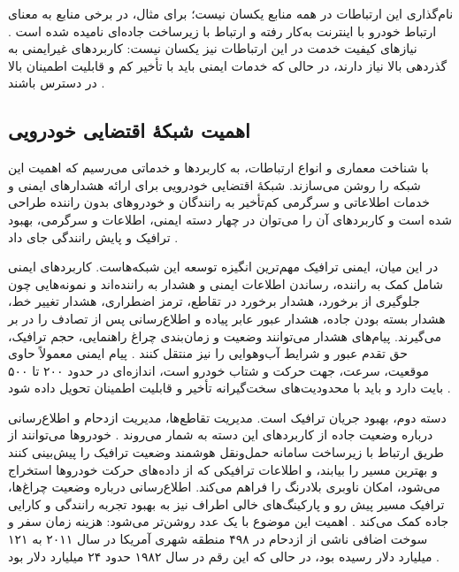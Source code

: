 \documentclass[12pt,a4paper]{article}
\begin{document}
نام‌گذاری این ارتباطات در همه منابع یکسان نیست؛ برای مثال، در برخی منابع  به معنای ارتباط خودرو با اینترنت به‌کار رفته و ارتباط با زیرساخت جاده‌ای  نامیده شده است \cite{luConnectedVehiclesSolutions2014}. نیاز‌های کیفیت خدمت  در این ارتباطات نیز یکسان نیست: کاربرد‌های غیرایمنی به گذردهی بالا نیاز دارند، در حالی که خدمات ایمنی باید با تأخیر کم و قابلیت اطمینان بالا در دسترس باشند \cite{hozouriOverviewVANETVehicular2023}.

\subsection{اهمیت شبکهٔ اقتضایی خودرویی}

با شناخت معماری و انواع ارتباطات، به کاربرد‌ها و خدماتی می‌رسیم که اهمیت این شبکه را روشن می‌سازند. شبکهٔ اقتضایی خودرویی برای ارائه هشدار‌های ایمنی و خدمات اطلاعاتی و سرگرمی کم‌تأخیر به رانندگان و خودرو‌های بدون راننده طراحی شده است و کاربرد‌های آن را می‌توان در چهار دسته ایمنی، اطلاعات و سرگرمی، بهبود ترافیک و پایش رانندگی جای داد \cite{hozouriOverviewVANETVehicular2023}.

در این میان، ایمنی ترافیک مهم‌ترین انگیزه توسعه این شبکه‌هاست. کاربرد‌های ایمنی شامل کمک به راننده، رساندن اطلاعات ایمنی و هشدار به راننده‌اند و نمونه‌هایی چون جلوگیری از برخورد، هشدار برخورد در تقاطع، ترمز اضطراری، هشدار تغییر خط، هشدار بسته بودن جاده، هشدار عبور عابر پیاده و اطلاع‌رسانی پس از تصادف را در بر می‌گیرند. پیام‌های هشدار می‌توانند وضعیت و زمان‌بندی چراغ راهنمایی، حجم ترافیک، حق تقدم عبور و شرایط آب‌وهوایی را نیز منتقل کنند \cite{hozouriOverviewVANETVehicular2023}. پیام ایمنی معمولاً حاوی موقعیت، سرعت، جهت حرکت و شتاب خودرو است، اندازه‌ای در حدود ۲۰۰ تا ۵۰۰ بایت دارد و باید با محدودیت‌های سخت‌گیرانه تأخیر و قابلیت اطمینان تحویل داده شود \cite{xuInternetVehiclesBig2018}.

دسته دوم، بهبود جریان ترافیک است. مدیریت تقاطع‌ها، مدیریت ازدحام و اطلاع‌رسانی درباره وضعیت جاده از کاربرد‌های این دسته به شمار می‌روند \cite{hozouriOverviewVANETVehicular2023}. خودرو‌ها می‌توانند از طریق ارتباط با زیرساخت سامانه حمل‌ونقل هوشمند وضعیت ترافیک را پیش‌بینی کنند و بهترین مسیر را بیابند، و اطلاعات ترافیکی که از داده‌های حرکت خودرو‌ها استخراج می‌شود، امکان ناوبری بلادرنگ را فراهم می‌کند. اطلاع‌رسانی درباره وضعیت چراغ‌ها، ترافیک مسیر پیش رو و پارکینگ‌های خالی اطراف نیز به بهبود تجربه رانندگی و کارایی جاده کمک می‌کند \cite{xuInternetVehiclesBig2018}. اهمیت این موضوع با یک عدد روشن‌تر می‌شود: هزینه زمان سفر و سوخت اضافی ناشی از ازدحام در ۴۹۸ منطقه شهری آمریکا در سال ۲۰۱۱ به ۱۲۱ میلیارد دلار رسیده بود، در حالی که این رقم در سال ۱۹۸۲ حدود ۲۴ میلیارد دلار بود \cite{luConnectedVehiclesSolutions2014}.
\end{document}
